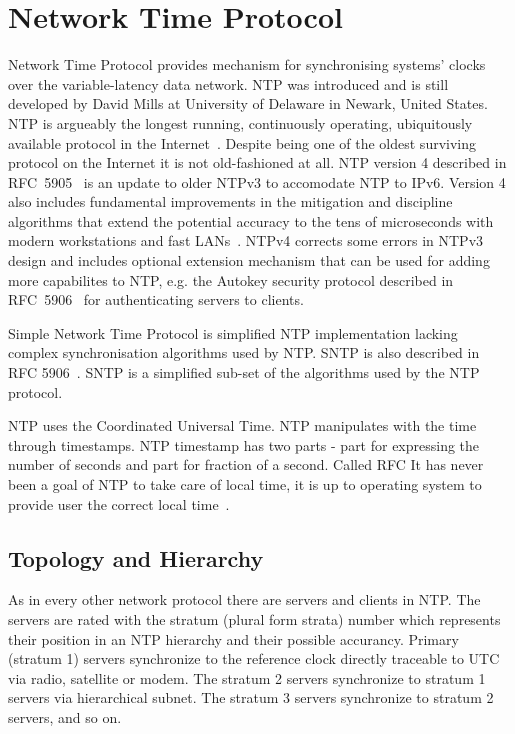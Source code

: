 
\chapter{Network Time Protocol}
Network Time Protocol provides mechanism for synchronising systems' clocks over the variable-latency data network.
NTP was introduced and is still developed by David Mills at University of Delaware in Newark, United States.
NTP is argueably the longest running, continuously operating,
ubiquitously available protocol in the Internet~\cite{ntp-overview}.
Despite being one of the oldest surviving protocol on the Internet it is not old-fashioned at all.
NTP version 4 described in RFC~5905~\cite{rfc5905} is an update to older NTPv3 to accomodate NTP to IPv6.
Version 4 also includes fundamental improvements in
the mitigation and discipline algorithms that extend
the potential accuracy to the tens of microseconds with modern
workstations and fast LANs~\cite{rfc5905}.
NTPv4 corrects some
errors in NTPv3 design and includes optional extension mechanism
that can be used for adding more capabilites to NTP, e.g. the
Autokey security protocol described in RFC~5906~\cite{rfc5906}
for authenticating servers to clients.

Simple Network Time Protocol is simplified NTP implementation lacking complex
synchronisation algorithms used by NTP. SNTP is also described in RFC 5906~\cite{rfc5906}.
SNTP is a simplified sub-set of the algorithms used by the NTP protocol.

NTP uses the Coordinated Universal Time.
NTP manipulates with the time through timestamps.
NTP timestamp has two parts - part for expressing the number of seconds
and part for fraction of a second. \!Called RFC
It has never been a goal of NTP to take care of local time,
it is up to operating system to provide user the correct local time~\cite{ntp-overview}.

\section{Topology and Hierarchy}
As in every other network protocol there are servers and clients in NTP.
The servers are rated with the stratum (plural form strata) number which represents their position
in an NTP hierarchy and their possible accurancy.
Primary (stratum 1) servers synchronize to the reference clock directly traceable to UTC via
radio, satellite or modem.
The stratum 2 servers synchronize to stratum 1
servers via hierarchical subnet.
The stratum 3 servers synchronize to stratum 2 servers, and so on.

